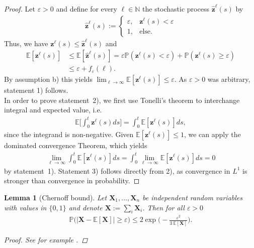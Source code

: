 \documentclass[a4paper,
               10pt,
               pdftex,
               normalheadings,
               headsepline,
               footsepline,
               headinclude,
               footinclude,
               DIV=14,
               abstracton]
{scrartcl}
\newtheorem{lemma}[theorem]{Lemma}
\newcommand{\rv}[1]{\bm{#1}}
\newcommand{\super}[1]{^{{#1}}}
\begin{document}
\begin{proof}
Let $\varepsilon > 0$ and define for every $\ell \in \mathbb{N}$ the stochastic process $\hat{\rv{z}}\super{\ell}(s)$ by
\begin{align}
    \hat{\rv{z}}\super{\ell}(s) := \begin{cases}
    \varepsilon, & \rv{z}\super{\ell}(s) < \varepsilon\\
    1, & \text{else.}
    \end{cases}
\end{align}
Thus, we have $\rv{z}\super{\ell}(s) \leq \hat{\rv{z}}\super{\ell}(s)$ and
\begin{align}
    \mathbb{E}[\rv{z}\super{\ell}(s)] &\leq \mathbb{E}[\hat{\rv{z}}\super{\ell}(s)] = \varepsilon \mathbb{P}(\rv{z}\super{\ell}(s) < \varepsilon) + \mathbb{P}(\rv{z}\super{\ell}(s) \geq \varepsilon)\\
    &\leq \varepsilon + f_\varepsilon(\ell).
\end{align}
By assumption b) this yields $\lim_{\ell \to \infty} \mathbb{E}[\rv{z}\super{\ell}(s)] \leq \varepsilon$.
As $\varepsilon > 0$ was arbitrary, statement 1) follows.\\
In order to prove statement~2), we first use Tonelli's theorem to interchange integral and expected value, i.e.
\begin{align}
    \mathbb{E}\Big[\int_0^t \rv{z}\super{\ell}(s) ds\Big] = \int_0^t \mathbb{E}[\rv{z}\super{\ell}(s)] ds,
\end{align}
since the integrand is non-negative.
Given $\mathbb{E}[\rv{z}\super{\ell}(s)] \leq 1$, we can apply the dominated convergence Theorem, which yields
\begin{align}
    \lim_{\ell \to \infty} \int_0^t \mathbb{E}[\rv{z}\super{\ell}(s)] ds = \int_0^t \lim_{\ell \to \infty} \mathbb{E}[\rv{z}\super{\ell}(s)] ds = 0
\end{align}
by statement~1). Statement 3) follows directly from 2), as convergence in $L^1$ is stronger than convergence in probability.
\end{proof}

\begin{lemma}[Chernoff bound] \label{lemma:chernoff}
Let $\rv{X}_1, \dots, \rv{X}_n$ be independent random variables with values in $\{0, 1\}$ and denote $\rv{X} := \sum_i \rv{X}_i$. Then for all $\varepsilon > 0$
\begin{align}
    \mathbb{P}\Big(\big\lvert \rv{X} - \mathbb{E}[\rv{X}] \big\rvert \geq \varepsilon\Big) \leq 2 \exp\Big(-\frac{\varepsilon^2}{3\ \mathbb{E}[\rv{X}]}\Big).
\end{align}
\begin{proof}
    See for example \cite[Theorem A.14]{Arora2009}.
\end{proof}

\end{lemma}
\end{document}
